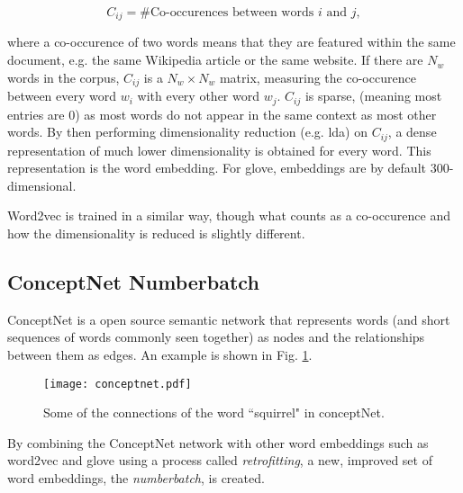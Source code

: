         \begin{equation}
        C_{ij} = \text{\# Co-occurences between words $i$ and $j$},
        \end{equation}

        where a co-occurence of two words means that they are featured within the same document, e.g. the same Wikipedia article or the same website. If there are $N_w$ words in the corpus, $C_{ij}$ is a $N_w \times N_w$ matrix, measuring the co-occurence between every word $w_i$ with every other word $w_j$.
        $C_{ij}$ is sparse, (meaning most entries are 0) as most words do not appear in the same context as most other words. By then performing dimensionality reduction (e.g. \gls{lda}) on $C_{ij}$, a dense representation of much lower dimensionality is obtained for every word. This representation is the word \gls{embedding}. For \gls{glove}, \glspl{embedding} are by default 300-dimensional\cite{glove}.

        Word2vec is trained in a similar way, though what counts as a co-occurence and how the dimensionality is reduced is slightly different\cite{word2vec}.

    \subsection{ConceptNet Numberbatch \label{ssec: Numberbatch}}

        ConceptNet is a open source semantic network that represents words (and short sequences of words commonly seen together) as nodes and the relationships between them as edges. An example is shown in Fig. \ref{fig: conceptnet}.
           \begin{figure}[h]
                \centering
                 \captionsetup{format=hang}
                \texttt{[image: conceptnet.pdf]}
                \caption{Some of the connections of the word ``squirrel" in conceptNet. \label{fig: conceptnet}}
            \end{figure}

        By combining the ConceptNet network with other word \glspl{embedding} such as word2vec and \gls{glove} using a process called \textit{retrofitting}, a new, improved set of word \glspl{embedding}, the \textit{\gls{numberbatch}}, is created.

